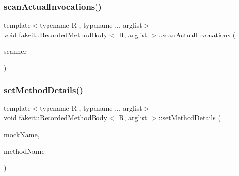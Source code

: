\subsubsection{\texorpdfstring{scanActualInvocations()}{scanActualInvocations()}\hspace{0.1cm}{\footnotesize\ttfamily [9/9]}}
{\footnotesize\ttfamily template$<$typename R , typename ... arglist$>$ \\
void \mbox{\hyperlink{classfakeit_1_1RecordedMethodBody}{fakeit\+::\+Recorded\+Method\+Body}}$<$ R, arglist $>$\+::scan\+Actual\+Invocations (\begin{DoxyParamCaption}\item[{const std\+::function$<$ void(\mbox{\hyperlink{structfakeit_1_1ActualInvocation}{Actual\+Invocation}}$<$ arglist... $>$ \&)$>$ \&}]{scanner }\end{DoxyParamCaption})\hspace{0.3cm}{\ttfamily [inline]}}

\mbox{\label{classfakeit_1_1RecordedMethodBody_abd4ca14120d7a8b302b06e05148b523c}} 
\subsubsection{\texorpdfstring{setMethodDetails()}{setMethodDetails()}\hspace{0.1cm}{\footnotesize\ttfamily [1/9]}}
{\footnotesize\ttfamily template$<$typename R , typename ... arglist$>$ \\
void \mbox{\hyperlink{classfakeit_1_1RecordedMethodBody}{fakeit\+::\+Recorded\+Method\+Body}}$<$ R, arglist $>$\+::set\+Method\+Details (\begin{DoxyParamCaption}\item[{const std\+::string \&}]{mock\+Name,  }\item[{const std\+::string \&}]{method\+Name }\end{DoxyParamCaption})\hspace{0.3cm}{\ttfamily [inline]}}

\mbox{\label{classfakeit_1_1RecordedMethodBody_abd4ca14120d7a8b302b06e05148b523c}} 
